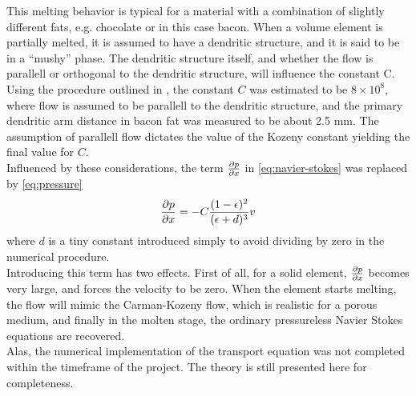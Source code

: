 This melting behavior is typical for a material with a combination of slightly different
fats, e.g. chocolate or in this case bacon. When a volume element is partially
melted, it is assumed to have a dendritic structure, and it is said to be in a
``mushy'' phase. The dendritic structure itself, and whether the flow is parallell or
orthogonal to the dendritic structure, will influence the constant C. \\

Using the procedure outlined in \cite{poirier}, the constant $C$ was estimated to be
$8 \times 10^8$, where flow is assumed to be parallell to the dendritic
structure, and the primary dendritic arm distance in bacon fat was measured to be
about 2.5 mm. The assumption of parallell flow dictates the value of the Kozeny
constant yielding the final value for $C$.\\

Influenced by these considerations, the term $\frac{\partial p}{\partial x}$ in
\cref{eq:navier-stokes} was replaced by \cref{eq:pressure}
\begin{equation}
  \frac{\partial p}{\partial x} =  -C\frac{ (1-\epsilon)^2}{(\epsilon+d)^3} v
  \label{eq:pressure}
\end{equation}
where $d$ is a tiny constant introduced simply to avoid dividing by zero in the
numerical procedure.\\

Introducing this term has two effects. First of all, for a solid element,
$\frac{\partial p}{\partial x}$ becomes very large, and forces the velocity to be zero. When the
element starts melting, the flow will mimic the Carman-Kozeny flow, which is
realistic for a porous medium, and finally in the molten stage, the ordinary
pressureless Navier Stokes equations are recovered.\\

Alas, the numerical implementation of the transport equation was not completed
within the timeframe of the project. The theory is still presented here for
completeness.


